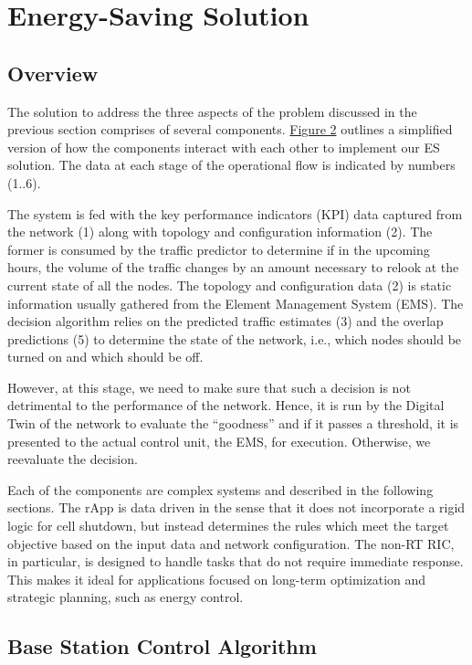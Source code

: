 \section{Energy-Saving Solution}
\subsection{Overview}
\label{sec:overview}

The solution to address the three aspects of the problem discussed in the previous section comprises of several components. 
\hyperref[fig:sol]{Figure 2} outlines a simplified version of how the components interact with each other to implement our ES solution. 
The data at each stage of the operational flow is indicated by numbers (1..6). 

The system is fed with the key performance indicators (KPI) data captured from the network (1) along with topology and configuration information (2). 
The former is consumed by the traffic predictor to determine if in the upcoming hours, the volume of the traffic changes by an amount necessary to relook at the current state of all the nodes. 
The topology and configuration data (2) is static information usually gathered from the Element Management System (EMS). 
The decision algorithm relies on the predicted traffic estimates (3) and the overlap predictions (5) to determine the state of the network, i.e., which nodes should be turned on and which should be off. 

However, at this stage, we need to make sure that such a decision is not detrimental to the performance of the network. 
Hence, it is run by the Digital Twin of the network to evaluate the “goodness” and if it passes a threshold, it is presented to the actual control unit, the EMS, for execution. 
Otherwise, we reevaluate the decision. 

Each of the components are complex systems and described in the following sections.
The rApp is data driven in the sense that it does not incorporate a rigid logic for cell shutdown, but instead determines the rules which meet the target objective based on the input data and network configuration. 
The non-RT RIC, in particular, is designed to handle tasks that do not require immediate response. 
This makes it ideal for applications focused on long-term optimization and strategic planning, such as energy control. 

%

\subsection{Base Station Control Algorithm}


